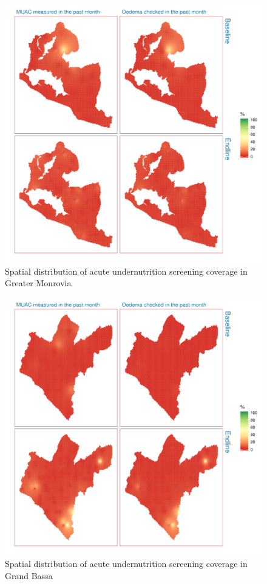 \documentclass[12pt,a4paper]{article}
\begin{document}
\begin{figure}[H]

{\centering \includegraphics{liberiaCoverageFinalReport_files/figure-latex/screen1map-1} 

}

\caption{Spatial distribution of acute undernutrition screening coverage in Greater Monrovia}\label{fig:screen1map}
\end{figure}

\begin{figure}[H]

{\centering \includegraphics{liberiaCoverageFinalReport_files/figure-latex/screen2map-1} 

}

\caption{Spatial distribution of acute undernutrition screening coverage in Grand Bassa}\label{fig:screen2map}
\end{figure}
\end{document}
